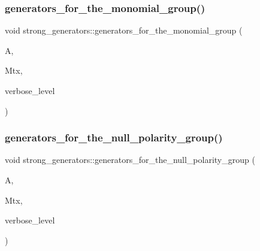 \mbox{\label{classstrong__generators_a504b7cefda70b646b2064f80784d7f8a}} 
\subsubsection{\texorpdfstring{generators\+\_\+for\+\_\+the\+\_\+monomial\+\_\+group()}{generators\_for\_the\_monomial\_group()}}
{\footnotesize\ttfamily void strong\+\_\+generators\+::generators\+\_\+for\+\_\+the\+\_\+monomial\+\_\+group (\begin{DoxyParamCaption}\item[{\mbox{\hyperlink{classaction}{action}} $\ast$}]{A,  }\item[{\mbox{\hyperlink{classmatrix__group}{matrix\+\_\+group}} $\ast$}]{Mtx,  }\item[{\mbox{\hyperlink{galois_8h_a09fddde158a3a20bd2dcadb609de11dc}{I\+NT}}}]{verbose\+\_\+level }\end{DoxyParamCaption})}

\mbox{\label{classstrong__generators_ab770f76f9a55c339f9a43b293d86e2f1}} 
\subsubsection{\texorpdfstring{generators\+\_\+for\+\_\+the\+\_\+null\+\_\+polarity\+\_\+group()}{generators\_for\_the\_null\_polarity\_group()}}
{\footnotesize\ttfamily void strong\+\_\+generators\+::generators\+\_\+for\+\_\+the\+\_\+null\+\_\+polarity\+\_\+group (\begin{DoxyParamCaption}\item[{\mbox{\hyperlink{classaction}{action}} $\ast$}]{A,  }\item[{\mbox{\hyperlink{classmatrix__group}{matrix\+\_\+group}} $\ast$}]{Mtx,  }\item[{\mbox{\hyperlink{galois_8h_a09fddde158a3a20bd2dcadb609de11dc}{I\+NT}}}]{verbose\+\_\+level }\end{DoxyParamCaption})}

